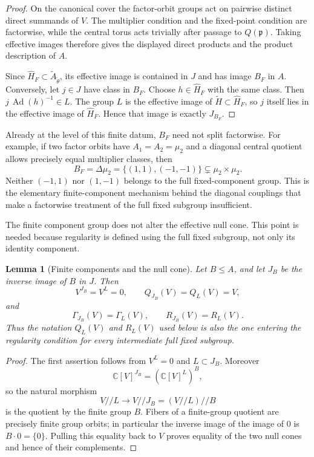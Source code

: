 \documentclass[11pt,reqno]{amsart}
\numberwithin{equation}{section}
\newtheorem{lemma}[theorem]{Lemma}
\theoremstyle{definition}
\theoremstyle{remark}
\newcommand{\C}{\mathbb C}
\newcommand{\Ad}{\operatorname{Ad}}
\newcommand{\fp}{\mathfrak p}
\newcommand{\sslash}{/\!\!/}
\begin{document}
\begin{proof}
On the canonical cover the factor-orbit groups act on pairwise distinct direct
summands of $V$.  The multiplier condition and the fixed-point condition are
factorwise, while the central torus acts trivially after passage to $Q(\fp)$.
Taking effective images therefore gives the displayed direct products and the
product description of $A$.

Since $\widehat H_F\subset\widetilde A_{\widetilde\theta}$, its effective
image is contained in $J$ and has image $B_F$ in $A$.  Conversely, let
$j\in J$ have class in $B_F$.  Choose $h\in\widehat H_F$ with the same class.
Then $j\,\Ad(h)^{-1}\in L$.  The group $L$ is the effective image of
$\widetilde H\subset\widehat H_F$, so $j$ itself lies in the effective image
of $\widehat H_F$.  Hence that image is exactly $J_{B_F}$.
\end{proof}

Already at the level of this finite datum, $B_F$ need not split factorwise.
For example, if two factor orbits have $A_1=A_2=\mu_2$ and a diagonal
central quotient allows precisely equal multiplier classes, then
\[
 B_F=\Delta\mu_2=\{(1,1),(-1,-1)\}
       \subsetneq\mu_2\times\mu_2.
\]
Neither $(-1,1)$ nor $(1,-1)$ belongs to the full fixed-component group.  This
is the elementary finite-component mechanism behind the diagonal couplings
that make a factorwise treatment of the full fixed subgroup insufficient.

The finite component group does not alter the effective null cone.  This point
is needed because regularity is defined using the full fixed subgroup, not only
its identity component.

\begin{lemma}[Finite components and the null cone]
\label{lem:finite-components-nullcone}
Let $B\leq A$, and let $J_B$ be the inverse image of $B$ in $J$.  Then
\[
 V^{J_B}=V^L=0,\qquad Q_{J_B}(V)=Q_L(V)=V,
\]
and
\[
 \Gamma_{J_B}(V)=\Gamma_L(V),\qquad
 R_{J_B}(V)=R_L(V).
\]
Thus the notation $Q_L(V)$ and $R_L(V)$ used below is also the one entering the
regularity condition for every intermediate full fixed subgroup.
\end{lemma}

\begin{proof}
The first assertion follows from $V^L=0$ and $L\subset J_B$.  Moreover
\[
 \C[V]^{J_B}=(\C[V]^L)^B,
\]
so the natural morphism
\[
 V\sslash L\longrightarrow V\sslash J_B=(V\sslash L)\sslash B
\]
is the quotient by the finite group $B$.  Fibers of a finite-group quotient are
precisely finite group orbits; in particular the inverse image of the image of
$0$ is $B\cdot0=\{0\}$.  Pulling this equality back to $V$ proves equality of
the two null cones and hence of their complements.
\end{proof}
\end{document}

